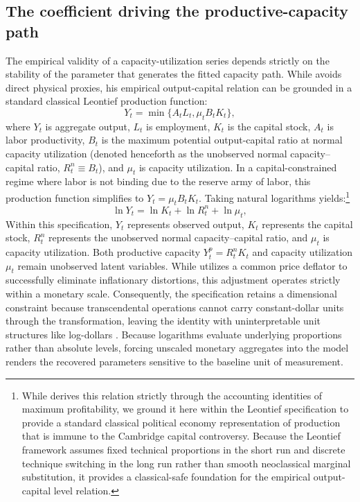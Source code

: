 \documentclass[11pt]{article}
\begin{document}
\subsection{The coefficient driving the productive-capacity path}
\label{subsec:coefficient_capacity_path}The empirical validity of a capacity-utilization series depends strictly on the stability of the parameter that generates the fitted capacity path. While \citet{Shaikh2016} avoids direct physical proxies, his empirical output-capital relation can be grounded in a standard classical Leontief production function:
\begin{equation}
Y_t = \min \{ A_t L_t, \mu_t B_t K_t \},
\end{equation}
where $Y_t$ is aggregate output, $L_t$ is employment, $K_t$ is the capital stock, $A_t$ is labor productivity, $B_t$ is the maximum potential output-capital ratio at normal capacity utilization (denoted henceforth as the unobserved normal capacity--capital ratio, $R^n_t \equiv B_t$), and $\mu_t$ is capacity utilization. In a capital-constrained regime where labor is not binding due to the reserve army of labor, this production function simplifies to $Y_t = \mu_t B_t K_t$. Taking natural logarithms yields:\footnote{While \citet{Shaikh2016} derives this relation strictly through the accounting identities of maximum profitability, we ground it here within the Leontief specification to provide a standard classical political economy representation of production that is immune to the Cambridge capital controversy. Because the Leontief framework assumes fixed technical proportions in the short run and discrete technique switching in the long run rather than smooth neoclassical marginal substitution, it provides a classical-safe foundation for the empirical output-capital level relation.}
\begin{equation}
\ln Y_t = \ln K_t + \ln R^n_t + \ln \mu_t,
\end{equation}
Within this specification, $Y_t$ represents observed output, $K_t$ represents the capital stock, $R^n_t$ represents the unobserved normal capacity--capital ratio, and $\mu_t$ is capacity utilization. Both productive capacity $Y^p_t = R^n_t K_t$ and capacity utilization $\mu_t$ remain unobserved latent variables. While \citet{Shaikh2016} utilizes a common price deflator to successfully eliminate inflationary distortions, this adjustment operates strictly within a monetary scale. Consequently, the specification retains a dimensional constraint because transcendental operations cannot carry constant-dollar units through the transformation, leaving the identity with uninterpretable unit structures like log-dollars \citep{Basu2022dimensional}. Because logarithms evaluate underlying proportions rather than absolute levels, forcing unscaled monetary aggregates into the model renders the recovered parameters sensitive to the baseline unit of measurement.
\end{document}
